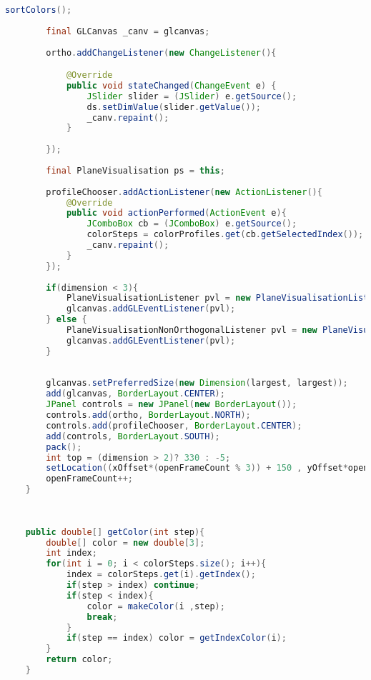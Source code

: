 \documentclass[pdftex,a4paper,10pt,titlepage]{article}
\begin{document}
\begin{lstlisting}[language=java, breaklines=true]
        sortColors();
        
        final GLCanvas _canv = glcanvas;
        
        ortho.addChangeListener(new ChangeListener(){

            @Override
            public void stateChanged(ChangeEvent e) {
                JSlider slider = (JSlider) e.getSource();
                ds.setDimValue(slider.getValue());
                _canv.repaint();
            }
        
        });
        
        final PlaneVisualisation ps = this;
        
        profileChooser.addActionListener(new ActionListener(){
            @Override
            public void actionPerformed(ActionEvent e){
                JComboBox cb = (JComboBox) e.getSource();
                colorSteps = colorProfiles.get(cb.getSelectedIndex());
                _canv.repaint();
            }
        });
        
        if(dimension < 3){
            PlaneVisualisationListener pvl = new PlaneVisualisationListener(this, this.ds, this.dimension, ds.getMaxValue()/2, largest);
            glcanvas.addGLEventListener(pvl);
        } else {
            PlaneVisualisationNonOrthogonalListener pvl = new PlaneVisualisationNonOrthogonalListener(this, this.ds, this.dimension, ds.getMaxValue()/2, largest);
            glcanvas.addGLEventListener(pvl);
        }
        
        
        glcanvas.setPreferredSize(new Dimension(largest, largest));
        add(glcanvas, BorderLayout.CENTER);
        JPanel controls = new JPanel(new BorderLayout());
        controls.add(ortho, BorderLayout.NORTH);
        controls.add(profileChooser, BorderLayout.CENTER);
        add(controls, BorderLayout.SOUTH);
        pack();
        int top = (dimension > 2)? 330 : -5;
        setLocation((xOffset*(openFrameCount % 3)) + 150 , yOffset*openFrameCount + top);
        openFrameCount++;
    }
    
    
    
    public double[] getColor(int step){
        double[] color = new double[3];
        int index;
        for(int i = 0; i < colorSteps.size(); i++){
            index = colorSteps.get(i).getIndex();
            if(step > index) continue;
            if(step < index){
                color = makeColor(i ,step);
                break;
            }
            if(step == index) color = getIndexColor(i);
        }
        return color;
    }
    

\end{lstlisting}
\end{document}
